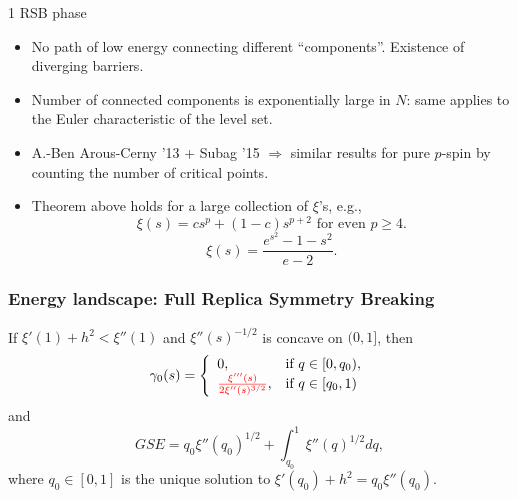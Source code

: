 \documentclass[handout]{beamer}
\begin{document}
	
	\begin{frame}{1 RSB phase}
	
	
	
		\begin{itemize}
		\item No path of low energy connecting different ``components''. Existence of diverging barriers.
		\item Number of connected components is exponentially large in $N$: same applies to the Euler characteristic of the level set. 
		
		
		\item A.-Ben Arous-Cerny '13 + Subag '15 $\Rightarrow$ similar results for pure $p$-spin by counting the number of critical points.
		\item Theorem above holds for a large collection of $\xi$'s,  e.g., 
			 $$\xi(s)=cs^p+(1-c)s^{p+2}\,\,\mbox{for even $p\geq 4.$}$$
			$$\xi(s)=\frac{e^{s^2}-1-s^2}{e-2}.$$
		\end{itemize}
	\end{frame}


\begin{frame}
	\frametitle{Energy landscape: Full Replica Symmetry Breaking}
	\begin{theorem} If $\xi'(1)+h^2<\xi''(1)$ and $\xi''(s)^{-1/2}$ is concave on $(0,1]$, then
		{\footnotesize$$
			\gamma_0(s)=
			\left\{
			\begin{array}{ll}
			0,&\mbox{if $q\in[0,q_0)$},\\
			{\color{red}\frac{\xi'''(s)}{2\xi''(s)^{3/2}}},&\mbox{if $q\in [q_0,1)$}
			\end{array}
			\right.
			$$}
		and
		{\footnotesize$$
			GSE=q_0\xi''(q_0)^{1/2}+\int_{q_0}^1\xi''(q)^{1/2}dq,
			$$}
		where $q_0\in[0,1]$ is the unique solution to $\xi'(q_0)+h^2=q_0\xi''(q_0).$ 
	\end{theorem}

\end{frame}
\end{document}
